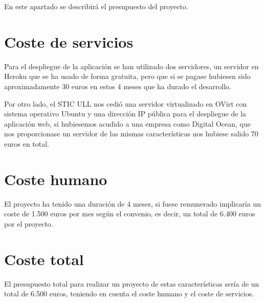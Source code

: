 

En este apartado se describirá el presupuesto del proyecto.

\section{Coste de servicios}
\label{7:sec:1}

Para el despliegue de la aplicación se han utilizado dos servidores, un servidor en Heroku que se ha usado de forma gratuita, pero que si se pagase hubiesen sido aproximadamente 30 euros en estos 4 meses que ha durado el desarrollo.

Por otro lado, el STIC ULL nos cedió una servidor virtualizado en OVirt con sistema operativo Ubuntu y una dirección IP pública para el despliegue de la aplicación web, si hubiesemos acudido a una empresa como Digital Ocean, que nos proporcionase un servidor de las mismas características nos hubiese salido 70 euros en total.

\section{Coste humano}
\label{7:sec:2}

El proyecto ha tenido una duración de 4 meses, si fuese remunerado implicaría un coste de 1.500 euros por mes según el convenio, es decir, un total de 6.400 euros por el proyecto.

\section{Coste total}
\label{7:sec:3}

El presupuesto total para realizar un proyecto de estas características sería de un total de 6.500 euros, teniendo en cuenta el coste humano y el coste de servicios.
